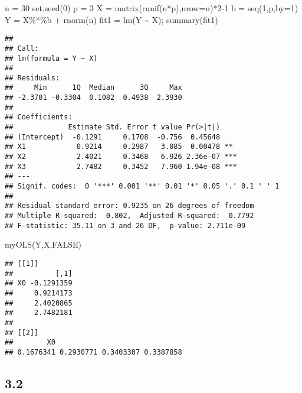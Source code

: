 \documentclass[
  11pt,
]{article}
\newenvironment{Shaded}{\begin{snugshade}}{\end{snugshade}}
\newcommand{\AttributeTok}[1]{\textcolor[rgb]{0.77,0.63,0.00}{#1}}
\newcommand{\ConstantTok}[1]{\textcolor[rgb]{0.00,0.00,0.00}{#1}}
\newcommand{\DecValTok}[1]{\textcolor[rgb]{0.00,0.00,0.81}{#1}}
\newcommand{\FunctionTok}[1]{\textcolor[rgb]{0.00,0.00,0.00}{#1}}
\newcommand{\NormalTok}[1]{#1}
\newcommand{\OtherTok}[1]{\textcolor[rgb]{0.56,0.35,0.01}{#1}}
\newcommand{\SpecialCharTok}[1]{\textcolor[rgb]{0.00,0.00,0.00}{#1}}
\begin{document}
\begin{Shaded}
\begin{Highlighting}[]
\NormalTok{n }\OtherTok{=} \DecValTok{30}
\FunctionTok{set.seed}\NormalTok{(}\DecValTok{0}\NormalTok{)}
\NormalTok{p }\OtherTok{=} \DecValTok{3}
\NormalTok{X }\OtherTok{=} \FunctionTok{matrix}\NormalTok{(}\FunctionTok{runif}\NormalTok{(n}\SpecialCharTok{*}\NormalTok{p),}\AttributeTok{nrow=}\NormalTok{n)}\SpecialCharTok{*}\DecValTok{2{-}1}
\NormalTok{b }\OtherTok{=} \FunctionTok{seq}\NormalTok{(}\DecValTok{1}\NormalTok{,p,}\AttributeTok{by=}\DecValTok{1}\NormalTok{)}
\NormalTok{Y }\OtherTok{=}\NormalTok{ X}\SpecialCharTok{\%*\%}\NormalTok{b }\SpecialCharTok{+} \FunctionTok{rnorm}\NormalTok{(n)}
\NormalTok{fit1 }\OtherTok{=} \FunctionTok{lm}\NormalTok{(Y }\SpecialCharTok{\textasciitilde{}}\NormalTok{ X); }\FunctionTok{summary}\NormalTok{(fit1)}
\end{Highlighting}
\end{Shaded}

\begin{verbatim}
## 
## Call:
## lm(formula = Y ~ X)
## 
## Residuals:
##     Min      1Q  Median      3Q     Max 
## -2.3701 -0.3304  0.1082  0.4938  2.3930 
## 
## Coefficients:
##             Estimate Std. Error t value Pr(>|t|)    
## (Intercept)  -0.1291     0.1708  -0.756  0.45648    
## X1            0.9214     0.2987   3.085  0.00478 ** 
## X2            2.4021     0.3468   6.926 2.36e-07 ***
## X3            2.7482     0.3452   7.960 1.94e-08 ***
## ---
## Signif. codes:  0 '***' 0.001 '**' 0.01 '*' 0.05 '.' 0.1 ' ' 1
## 
## Residual standard error: 0.9235 on 26 degrees of freedom
## Multiple R-squared:  0.802,  Adjusted R-squared:  0.7792 
## F-statistic: 35.11 on 3 and 26 DF,  p-value: 2.711e-09
\end{verbatim}

\begin{Shaded}
\begin{Highlighting}[]
\FunctionTok{myOLS}\NormalTok{(Y,X,}\ConstantTok{FALSE}\NormalTok{)}
\end{Highlighting}
\end{Shaded}

\begin{verbatim}
## [[1]]
##          [,1]
## X0 -0.1291359
##     0.9214173
##     2.4020865
##     2.7482181
## 
## [[2]]
##        X0                               
## 0.1676341 0.2930771 0.3403307 0.3387858
\end{verbatim}

\hypertarget{section-1}{%
\subsection{3.2}\label{section-1}}
\end{document}
